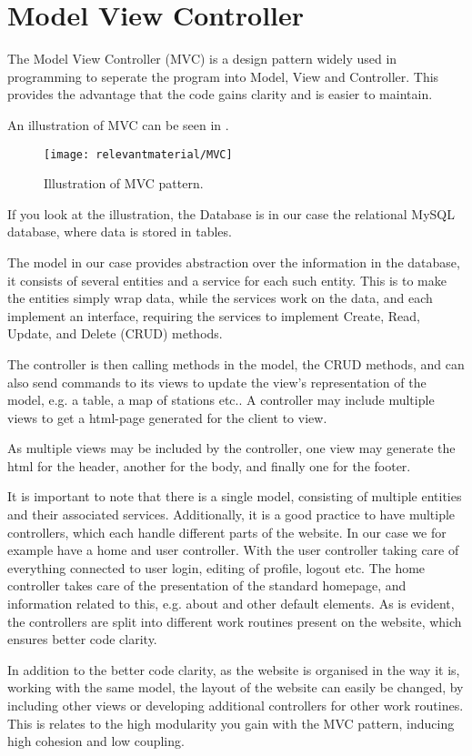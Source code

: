 \section{Model View Controller}
The Model View Controller (MVC) is a design pattern widely used in programming to seperate the program into Model, View and Controller. This provides the advantage that the code gains clarity and is easier to maintain.

An illustration of MVC can be seen in .
\begin{figure}[h]
	\centering
	\texttt{[image: relevantmaterial/MVC]}
	\caption{Illustration of MVC pattern.}\label{fig:MVC}
\end{figure}

If you look at the illustration, the Database is in our case the relational MySQL database, where data is stored in tables.

The model in our case provides abstraction over the information in the database, it consists of several entities and a service for each such entity.
This is to make the entities simply wrap data, while the services work on the data, and each implement an interface, requiring the services to implement Create, Read, Update, and Delete (CRUD) methods.

The controller is then calling methods in the model, the CRUD methods, and can also send commands to its views to update the view's representation of the model, e.g. a table, a map of stations etc..
A controller may include multiple views to get a html-page generated for the client to view.

As multiple views may be included by the controller, one view may generate the html for the header, another for the body, and finally one for the footer.

It is important to note that there is a single model, consisting of multiple entities and their associated services.
Additionally, it is a good practice to have multiple controllers, which each handle different parts of the website.
In our case we for example have a home and user controller.
With the user controller taking care of everything connected to user login, editing of profile, logout etc.
The home controller takes care of the presentation of the standard homepage, and information related to this, e.g. about and other default elements.
As is evident, the controllers are split into different work routines present on the website, which ensures better code clarity.

In addition to the better code clarity, as the website is organised in the way it is, working with the same model, the layout of the website can easily be changed, by including other views or developing additional controllers for other work routines.
This is relates to the high modularity you gain with the MVC pattern, inducing high cohesion and low coupling.